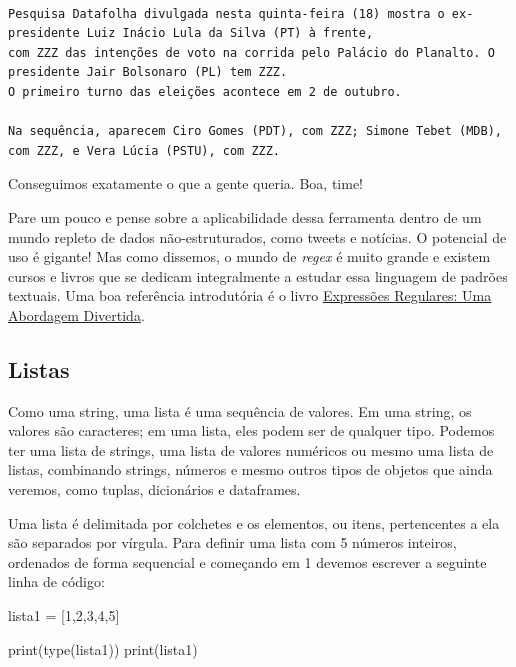 \documentclass[
  brazilian,
  letterpaper,
  DIV=11,
  numbers=noendperiod]{scrreprt}
\newenvironment{Shaded}{\begin{snugshade}}{\end{snugshade}}
\newcommand{\BuiltInTok}[1]{\textcolor[rgb]{0.00,0.23,0.31}{#1}}
\newcommand{\DecValTok}[1]{\textcolor[rgb]{0.68,0.00,0.00}{#1}}
\newcommand{\NormalTok}[1]{\textcolor[rgb]{0.00,0.23,0.31}{#1}}
\newcommand{\OperatorTok}[1]{\textcolor[rgb]{0.37,0.37,0.37}{#1}}
\begin{document}
\begin{verbatim}

Pesquisa Datafolha divulgada nesta quinta-feira (18) mostra o ex-presidente Luiz Inácio Lula da Silva (PT) à frente, 
com ZZZ das intenções de voto na corrida pelo Palácio do Planalto. O presidente Jair Bolsonaro (PL) tem ZZZ. 
O primeiro turno das eleições acontece em 2 de outubro.

Na sequência, aparecem Ciro Gomes (PDT), com ZZZ; Simone Tebet (MDB), com ZZZ, e Vera Lúcia (PSTU), com ZZZ.
\end{verbatim}

Conseguimos exatamente o que a gente queria. Boa, time!

Pare um pouco e pense sobre a aplicabilidade dessa ferramenta dentro de
um mundo repleto de dados não-estruturados, como tweets e notícias. O
potencial de uso é gigante! Mas como dissemos, o mundo de \emph{regex} é
muito grande e existem cursos e livros que se dedicam integralmente a
estudar essa linguagem de padrões textuais. Uma boa referência
introdutória é o livro
\href{https://www.amazon.com.br/Express\%C3\%B5es-Regulares-Uma-Abordagem-Divertida/dp/8575224743}{Expressões
Regulares: Uma Abordagem Divertida}.

\subsection{Listas}\label{listas}

Como uma string, uma lista é uma sequência de valores. Em uma string, os
valores são caracteres; em uma lista, eles podem ser de qualquer tipo.
Podemos ter uma lista de strings, uma lista de valores numéricos ou
mesmo uma lista de listas, combinando strings, números e mesmo outros
tipos de objetos que ainda veremos, como tuplas, dicionários e
dataframes.

Uma lista é delimitada por colchetes e os elementos, ou itens,
pertencentes a ela são separados por vírgula. Para definir uma lista com
5 números inteiros, ordenados de forma sequencial e começando em 1
devemos escrever a seguinte linha de código:

\begin{Shaded}
\begin{Highlighting}[]
\NormalTok{lista1 }\OperatorTok{=}\NormalTok{ [}\DecValTok{1}\NormalTok{,}\DecValTok{2}\NormalTok{,}\DecValTok{3}\NormalTok{,}\DecValTok{4}\NormalTok{,}\DecValTok{5}\NormalTok{]}

\BuiltInTok{print}\NormalTok{(}\BuiltInTok{type}\NormalTok{(lista1))}
\BuiltInTok{print}\NormalTok{(lista1)}
\end{Highlighting}
\end{Shaded}
\end{document}
